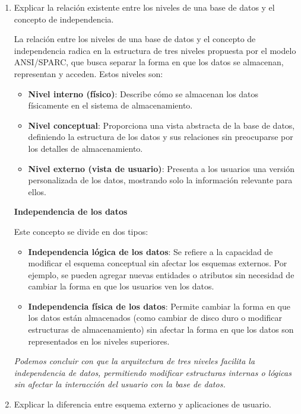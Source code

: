 \begin{enumerate}
    \item Explicar la relación existente entre los niveles de una base de datos y el concepto de independencia.
    

    La relación entre los niveles de una base de datos y el concepto de independencia radica en la estructura de tres niveles propuesta por el modelo ANSI/SPARC, que busca separar la forma en que los datos se almacenan, representan y acceden. Estos niveles son:
    \begin{itemize}
        \item \textbf{Nivel interno (físico)}: Describe cómo se almacenan los datos físicamente en el sistema de almacenamiento.
        \item \textbf{Nivel conceptual}: Proporciona una vista abstracta de la base de datos, definiendo la estructura de los datos y sus relaciones sin preocuparse por los detalles de almacenamiento.
        \item \textbf{Nivel externo (vista de usuario)}: Presenta a los usuarios una versión personalizada de los datos, mostrando solo la información relevante para ellos.
    \end{itemize}

    \textbf{Independencia de los datos}

    Este concepto se divide en dos tipos:
    \begin{itemize}
        \item \textbf{Independencia lógica de los datos}: Se refiere a la capacidad de modificar el esquema conceptual sin afectar los esquemas externos. Por ejemplo, se pueden agregar nuevas entidades o atributos sin necesidad de cambiar la forma en que los usuarios ven los datos.
        \item \textbf{Independencia física de los datos}: Permite cambiar la forma en que los datos están almacenados (como cambiar de disco duro o modificar estructuras de almacenamiento) sin afectar la forma en que los datos son representados en los niveles superiores.
    \end{itemize}

    \textit{Podemos concluir con que la arquitectura de tres niveles facilita la independencia de datos, permitiendo modificar estructuras internas o lógicas sin afectar la interacción del usuario con la base de datos.}

    \item Explicar la diferencia entre esquema externo y aplicaciones de usuario.
    


\end{enumerate}
